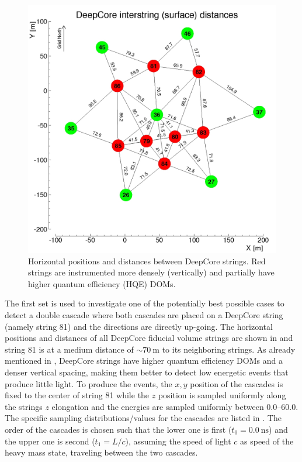 \begin{figure}[h]
    \centering
    \includegraphics{figures/icecube_deepcore/deepcore_surface_distances.jpg}
    \caption[DeepCore string spacing]{Horizontal positions and distances between DeepCore strings. Red strings are instrumented more densely (vertically) and partially have higher quantum efficiency (HQE) DOMs.}
\end{figure}

The first set is used to investigate one of the potentially best possible cases to detect a double cascade where both cascades are placed on a DeepCore string (namely string 81) and the directions are directly up-going. The horizontal positions and distances of all DeepCore fiducial volume strings are shown in  and string 81 is at a medium distance of $\sim\SI{70}{\metre}$ to its neighboring strings. As already mentioned in , DeepCore strings have higher quantum efficiency DOMs and a denser vertical spacing, making them better to detect low energetic events that produce little light. To produce the events, the $x,y$ position of the cascades is fixed to the center of string 81 while the $z$ position is sampled uniformly along the strings $z$ elongation and the energies are sampled uniformly between \SIrange[range-phrase={~and~}]{0.0}{60.0}{\gev}. The specific sampling distributions/values for the cascades are listed in . The order of the cascades is chosen such that the lower one is first ($t_0=\SI{0.0}{\nano\second}$) and the upper one is second ($t_1=L/c$), assuming the speed of light $c$ as speed of the heavy mass state, traveling between the two cascades.

